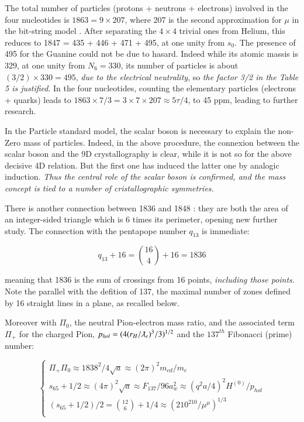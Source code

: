 \documentclass[a4paper,9pt]{article}
\begin{document}
The total number of particles (protons + neutrons + electrons) involved in the four nucleotides is $1863 = 9\times 207$, where 207 is the second approximation for $\mu$ in the bit-string model \cite{Noyes}. After separating the $4\times4$ trivial ones from Helium, this reduces to 1847 = 435 + 446 + 471 + 495, at one unity from $s_0$. The presence of 495 for the Guanine could not be due to hasard. Indeed while its atomic massis is 329, at one unity from $N_6 = 330$, its number of particles is about $(3/2) \times 330 = 495$, \textit {due to the electrical neutrality}, so \textit {the factor 3/2 in the Table 5 is justified}. In the four nucleotides, counting the elementary particles (electrons + quarks) leads to $1863 \times 7/3 = 3 \times 7 \times 207 \approx 5\tau/4$, to 45 ppm, leading to further research.


In the Particle standard  model, the scalar boson is necessary to explain the non-Zero mass of particles. Indeed, in the above procedure, the connexion between the scalar boson and the 9D crystallography is clear, while it is not so for the above decisive 4D relation. But the first one has induced the latter one by analogic induction. \textit{Thus the central role of the scalar boson is confirmed, and the mass concept is tied to a number of cristallographic symmetries.} 

There is another connection between 1836 and 1848 : they are both the area of an integer-sided triangle which is 6 times its perimeter, opening new further study. The connection with the pentapope number $q_{13}$ is immediate:

\begin{equation}\label{Eq29}
 q_{13}+16 = \binom{16}{4} + 16 = 1836
 \end{equation}
 
meaning that 1836 is the sum of crossings from 16 points, \textit {including those points}. Note the parallel with the defition of 137, the maximal number of zones defined by 16 straight lines in a plane, as recalled below.

Moreover with $\Pi_0$, the neutral Pion-electron mass ratio, and the associated term $\Pi_+$ for the charged Pion, $ p_{hol} = (4 (r_H/\lambdabar_e)^3/3)^{1/2}$ and the $137^{th}$ Fibonacci (prime) number:

 \begin{equation}\label{Eq30}
 \left\{
    \begin{array}{ll}
         \Pi_+ \Pi_0 \approx  1838^2/4\sqrt a \approx (2\pi)^2 m_{cd}/m_e \\
        s_{65} + 1/2 \approx (4\pi)^2 \sqrt a \approx F_{137}/96 a_w^2 \approx (q^2a/4)^2 H^{(0)}/p_{hol} \\
          (s_{65} +1/2)/2 = \binom{12}{6} + 1/4 \approx(210^{210}/\mu^{\mu})^{1/3} \\
    \end{array}
\right.
\end{equation}
\end{document}
